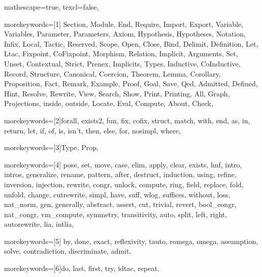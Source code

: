 
 {

mathescape=true,
texcl=false,


morekeywords=[1]{
Section, Module, End, Require, Import, Export,
Variable, Variables, Parameter, Parameters, Axiom, Hypothesis, Hypotheses,
Notation, Infix, Local, Tactic, Reserved, Scope, Open, Close, Bind, Delimit,
Definition, Let, Ltac, Fixpoint, CoFixpoint, Morphism, Relation,
Implicit, Arguments, Set, Unset, Contextual, Strict, Prenex,
Implicits, Types,
Inductive, CoInductive, Record, Structure, Canonical, Coercion,
Theorem, Lemma, Corollary, Proposition, Fact, Remark, Example,
Proof, Goal, Save, Qed, Admitted, Defined, Hint, Resolve, Rewrite, View,
Search, Show, Print, Printing, All, Graph, Projections,
inside, outside, Locate, Eval, Compute,
About, Check},


morekeywords=[2]{forall, exists2, fun, fix, cofix, struct,
      match, with, end, as, in, return, let, if, of, is, isn't, then, else,
      for, nosimpl, where},

morekeywords=[3]{Type, Prop},

morekeywords=[4]{
         pose, set, move, case, elim, apply, clear, exists,
            hnf, intro, intros, generalize, rename, pattern, after,
            destruct, induction, using, refine, inversion, injection,
         rewrite, congr, unlock, compute, ring, field,
            replace, fold, unfold, change, cutrewrite, simpl,
         have, suff, wlog, suffices, without, loss, nat_norm,
         gen, generally, abstract,
            assert, cut, trivial, revert, bool_congr, nat_congr, vm_compute,
         symmetry, transitivity, auto, split, left, right,
         autorewrite, lia, intlia},

morekeywords=[5]{
         by, done, exact, reflexivity, tauto, romega, omega,
         assumption, solve, contradiction, discriminate, admit},


morekeywords=[6]{do, last, first, try, idtac, repeat},

}
